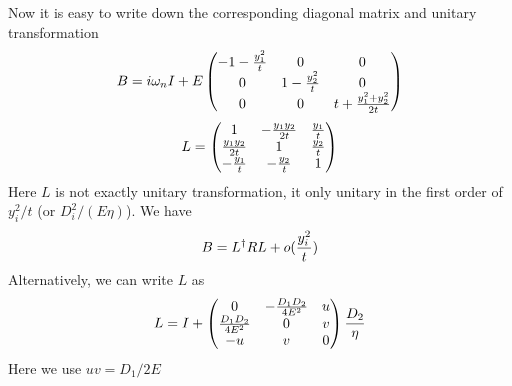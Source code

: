 Now it is easy to write down the corresponding diagonal matrix and unitary transformation
\begin{equation}
B=i\omega_{n}I+E\begin{pmatrix}-1-\frac{y_{1}^{2}}{t}&0&0\\0&1-\frac{y_{2}^{2}}{t}&0\\0&0&t+\frac{y_{1}^{2}+y_{2}^{2}}{2t}\end{pmatrix}
\end{equation}
\begin{equation}
L=\begin{pmatrix}1&-\frac{y_{1}y_{2}}{2t}&\frac{y_{1}}{t}\\\frac{y_{1}y_{2}}{2t}&1&\frac{y_{2}}{t}\\-\frac{y_{1}}{t}&-\frac{y_{2}}{t}&1\end{pmatrix}
\end{equation}
Here $L$ is not exactly unitary transformation, it only unitary in the first order of  $y_{i}^{2}/{t}$ (or $D_{i}^{2}/(E\eta)$). We have 
\[
B=L^{\dagger}RL+o(\frac{y_{i}^{2}}{t})
\]
Alternatively, we can write $L$ as 
\begin{equation}
L=I+
\begin{pmatrix}0&-\frac{D_{1}D_{2}}{4E^{2}}&u\\
\frac{D_{1}D_{2}}{4E^{2}}&0&v\\
-u&v&0
\end{pmatrix}\frac{D_{2}}{\eta}
\end{equation}
Here we use $uv=D_{1}/2E$



